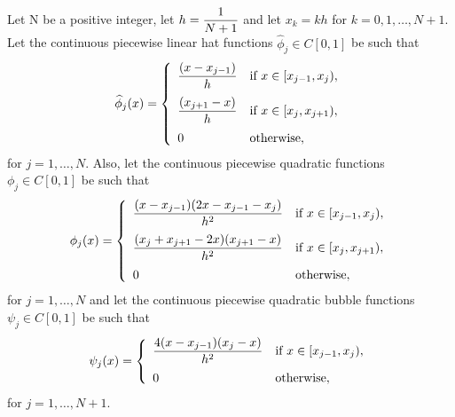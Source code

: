 Let N be a positive integer, let $\displaystyle{h={1 \over N+1}}$ and let $x_k=kh$ for $k=0,1,\ldots,N+1$. Let the continuous piecewise linear hat functions $\widehat{\phi}_j\in C[0,1]$ be such that
\[
\widehat{\phi}_j(x) = \left\{\begin{array}{ll}
\displaystyle{{(x-x_{j-1}) \over h}} & \displaystyle{\mbox{if }x\in[x_{j-1},x_j)},
\\[10pt]
\displaystyle{{(x_{j+1}-x) \over h}} & \displaystyle{\mbox{if }x\in[x_j,x_{j+1})},
\\[10pt]
0 & \mbox{otherwise},
\end{array}\right.
\]
for $j=1,\ldots,N$. Also, let the continuous piecewise quadratic functions $\phi_j\in C[0,1]$ be such that
\[
\phi_j(x)=\left\{\begin{array}{ll}
\displaystyle{{(x-x_{j-1})(2x-x_{j-1}-x_j) \over h^2}} & \displaystyle{\mbox{if }x\in[x_{j-1},x_j)},
\\[10pt]
\displaystyle{{(x_j+x_{j+1}-2x)(x_{j+1}-x) \over h^2}} & \displaystyle{\mbox{if }x\in[x_j,x_{j+1})},
\\[10pt]
0 & \mbox{otherwise},
\end{array}\right.
\]
for $j=1,\ldots,N$ and let the continuous piecewise quadratic bubble functions $\psi_j\in C[0,1]$ be such that
\[
\psi_j(x)=\left\{\begin{array}{ll}
\displaystyle{{4(x-x_{j-1})(x_j-x) \over h^2}} & \displaystyle{\mbox{if }x\in[x_{j-1},x_j)},
\\[10pt]
0 & \mbox{otherwise},
\end{array}\right.
\]
for $j=1,\ldots,N+1$.

